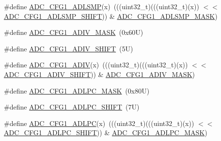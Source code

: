 \begin{DoxyCompactItemize}
\item 
\#define \mbox{\hyperlink{group___a_d_c___register___masks_ga83a0b2b8e5d22c85bc752995eadc23c8}{A\+D\+C\+\_\+\+C\+F\+G1\+\_\+\+A\+D\+L\+S\+MP}}(x)~(((uint32\+\_\+t)(((uint32\+\_\+t)(x)) $<$$<$ \mbox{\hyperlink{group___a_d_c___register___masks_gab2cd2b0ee8a3e6c0e3710e5477ba4f25}{A\+D\+C\+\_\+\+C\+F\+G1\+\_\+\+A\+D\+L\+S\+M\+P\+\_\+\+S\+H\+I\+FT}})) \& \mbox{\hyperlink{group___a_d_c___register___masks_ga3f96490246c5bef5f9ccede781423b22}{A\+D\+C\+\_\+\+C\+F\+G1\+\_\+\+A\+D\+L\+S\+M\+P\+\_\+\+M\+A\+SK}})
\item 
\#define \mbox{\hyperlink{group___a_d_c___register___masks_gaffbe8246d864b7889a3ce04b94e6d948}{A\+D\+C\+\_\+\+C\+F\+G1\+\_\+\+A\+D\+I\+V\+\_\+\+M\+A\+SK}}~(0x60\+U)
\item 
\#define \mbox{\hyperlink{group___a_d_c___register___masks_gacbe42773bc1f15c2870c2422c89bfe67}{A\+D\+C\+\_\+\+C\+F\+G1\+\_\+\+A\+D\+I\+V\+\_\+\+S\+H\+I\+FT}}~(5\+U)
\item 
\#define \mbox{\hyperlink{group___a_d_c___register___masks_ga7407a87e3d32012930901336c97b7694}{A\+D\+C\+\_\+\+C\+F\+G1\+\_\+\+A\+D\+IV}}(x)~(((uint32\+\_\+t)(((uint32\+\_\+t)(x)) $<$$<$ \mbox{\hyperlink{group___a_d_c___register___masks_gacbe42773bc1f15c2870c2422c89bfe67}{A\+D\+C\+\_\+\+C\+F\+G1\+\_\+\+A\+D\+I\+V\+\_\+\+S\+H\+I\+FT}})) \& \mbox{\hyperlink{group___a_d_c___register___masks_gaffbe8246d864b7889a3ce04b94e6d948}{A\+D\+C\+\_\+\+C\+F\+G1\+\_\+\+A\+D\+I\+V\+\_\+\+M\+A\+SK}})
\item 
\#define \mbox{\hyperlink{group___a_d_c___register___masks_ga308bdf4f339315924bd36b1f2aa3d254}{A\+D\+C\+\_\+\+C\+F\+G1\+\_\+\+A\+D\+L\+P\+C\+\_\+\+M\+A\+SK}}~(0x80\+U)
\item 
\#define \mbox{\hyperlink{group___a_d_c___register___masks_ga15e7cf514347ab7f32e2104b1776704e}{A\+D\+C\+\_\+\+C\+F\+G1\+\_\+\+A\+D\+L\+P\+C\+\_\+\+S\+H\+I\+FT}}~(7\+U)
\item 
\#define \mbox{\hyperlink{group___a_d_c___register___masks_ga614be72cb30e582c26d0b006b1aa9480}{A\+D\+C\+\_\+\+C\+F\+G1\+\_\+\+A\+D\+L\+PC}}(x)~(((uint32\+\_\+t)(((uint32\+\_\+t)(x)) $<$$<$ \mbox{\hyperlink{group___a_d_c___register___masks_ga15e7cf514347ab7f32e2104b1776704e}{A\+D\+C\+\_\+\+C\+F\+G1\+\_\+\+A\+D\+L\+P\+C\+\_\+\+S\+H\+I\+FT}})) \& \mbox{\hyperlink{group___a_d_c___register___masks_ga308bdf4f339315924bd36b1f2aa3d254}{A\+D\+C\+\_\+\+C\+F\+G1\+\_\+\+A\+D\+L\+P\+C\+\_\+\+M\+A\+SK}})
\end{DoxyCompactItemize}
